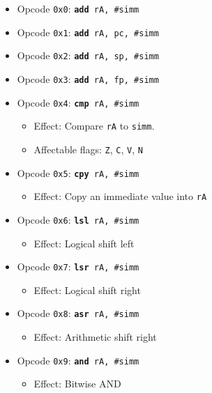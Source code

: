 \documentclass{article}
\begin{document}
	\singlespacing
	\begin{itemize}
	\item Opcode \texttt{0x0}:
		\texttt{\textbf{add} rA, \#simm}
	\item Opcode \texttt{0x1}:
		\texttt{\textbf{add} rA, pc, \#simm}
	\item Opcode \texttt{0x2}:
		\texttt{\textbf{add} rA, sp, \#simm}
	\item Opcode \texttt{0x3}:
		\texttt{\textbf{add} rA, fp, \#simm}
	\item Opcode \texttt{0x4}:
		\texttt{\textbf{cmp} rA, \#simm}
		\begin{itemize}
		\item Effect: Compare \texttt{rA} to \texttt{simm}.
		\item Affectable flags:
			\texttt{Z}, \texttt{C}, \texttt{V}, \texttt{N}
		\end{itemize}
	\item Opcode \texttt{0x5}:
		\texttt{\textbf{cpy} rA, \#simm}
		\begin{itemize}
		\item Effect: Copy an immediate value into \texttt{rA}
		\end{itemize}
	\item Opcode \texttt{0x6}:
		\texttt{\textbf{lsl} rA, \#simm}
		\begin{itemize}
		\item Effect: Logical shift left
		\end{itemize}
	\item Opcode \texttt{0x7}:
		\texttt{\textbf{lsr} rA, \#simm}
		\begin{itemize}
		\item Effect: Logical shift right
		\end{itemize}
	\item Opcode \texttt{0x8}:
		\texttt{\textbf{asr} rA, \#simm}
		\begin{itemize}
		\item Effect: Arithmetic shift right
		\end{itemize}
	\item Opcode \texttt{0x9}:
		\texttt{\textbf{and} rA, \#simm}
		\begin{itemize}
		\item Effect: Bitwise AND
		\end{itemize}

\end{itemize}
\end{document}
